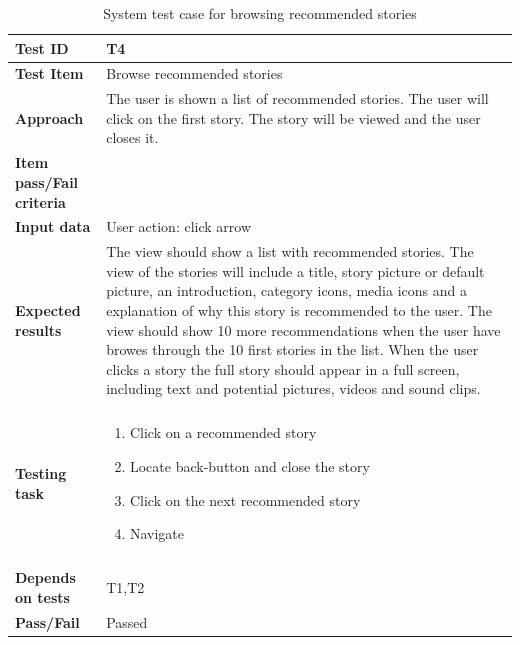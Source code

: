 \begin{appendices}
	\begin{table}[H]
		\centering
		\caption{System test case for browsing recommended stories}
		\begin{tabular}{ | l | l  |}
			\hline
			\hline
			\textbf{Test ID} & T4  \\ \hline
			\textbf{Test Item} & Browse recommended stories \\ \hline
			\textbf{Approach} & \begin{minipage}{5in}The user is shown a list of recommended stories. The user will click on the first story. The story will be viewed and the user closes it. 
			\end{minipage}\\ \hline
			\textbf{Item pass/Fail criteria} &  \\ \hline			
			\textbf{Input data} &  User action: click arrow\\ \hline
			\textbf{Expected results} & \begin{minipage}{5in}The view should show a list with recommended stories. The view of the stories will include a title, story picture or default picture, an introduction, category icons, media icons and a explanation of why this story is recommended to the user.  The view should show 10 more recommendations when the user have browes through the 10 first stories in the list.
			When the user clicks a story the full story should appear in a full screen, including text and potential pictures, videos and sound clips.   \end{minipage}\\ \hline&\\[-3.8ex]
			\textbf{Testing task} & \begin{minipage}{5in}
			\begin{enumerate}[noitemsep]
			\item Click on a recommended story
			\item Locate back-button and close the story
			\item Click on the next recommended story
			\item Navigate 
			\end{enumerate}\end{minipage}
			\\ &\\[-3.8ex]\hline
			\textbf{Depends on tests} & T1,T2 \\ \hline		
			\textbf{Pass/Fail} & Passed \\\hline			
		\end{tabular}
	

\end{table}
\end{appendices}
